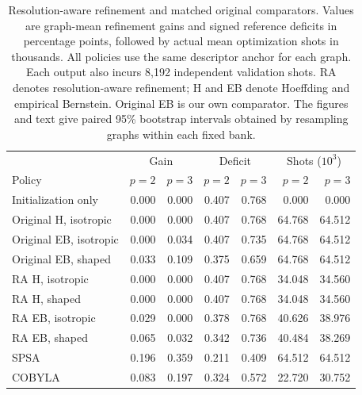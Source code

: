 \begin{table}[t]
\caption{Resolution-aware refinement and matched original comparators. Values are graph-mean refinement gains and signed reference deficits in percentage points, followed by actual mean optimization shots in thousands. All policies use the same descriptor anchor for each graph. Each output also incurs 8,192 independent validation shots. RA denotes resolution-aware refinement; H and EB denote Hoeffding and empirical Bernstein. Original EB is our own comparator. The figures and text give paired 95\% bootstrap intervals obtained by resampling graphs within each fixed bank.}\label{tab:refinement}
\centering\small\setlength{\tabcolsep}{4pt}
\begin{tabular}{lrrrrrr}\toprule
 & \multicolumn{2}{c}{Gain} & \multicolumn{2}{c}{Deficit} & \multicolumn{2}{c}{Shots ($10^3$)} \\
Policy & $p=2$ & $p=3$ & $p=2$ & $p=3$ & $p=2$ & $p=3$ \\ \midrule
Initialization only & 0.000 & 0.000 & 0.407 & 0.768 & 0.000 & 0.000 \\
Original H, isotropic & 0.000 & 0.000 & 0.407 & 0.768 & 64.768 & 64.512 \\
Original EB, isotropic & 0.000 & 0.034 & 0.407 & 0.735 & 64.768 & 64.512 \\
Original EB, shaped & 0.033 & 0.109 & 0.375 & 0.659 & 64.768 & 64.512 \\
RA H, isotropic & 0.000 & 0.000 & 0.407 & 0.768 & 34.048 & 34.560 \\
RA H, shaped & 0.000 & 0.000 & 0.407 & 0.768 & 34.048 & 34.560 \\
RA EB, isotropic & 0.029 & 0.000 & 0.378 & 0.768 & 40.626 & 38.976 \\
RA EB, shaped & 0.065 & 0.032 & 0.342 & 0.736 & 40.484 & 38.269 \\
SPSA & 0.196 & 0.359 & 0.211 & 0.409 & 64.512 & 64.512 \\
COBYLA & 0.083 & 0.197 & 0.324 & 0.572 & 22.720 & 30.752 \\
\bottomrule\end{tabular}\end{table}
\newcommand{\ResolutionResults}{%
\paragraph{Stopping status distinguishes limited resolution from adverse evidence.}
The factorial records the following terminal statuses: \texttt{resolution\_limited}: 256. An unresolved comparison provides insufficient evidence to classify the direction. A resolution-limited stop records the end of the prescribed model or decision schedule without a resolved update. It does not establish stationarity, optimality, or the impossibility of a useful update under another allocation.
The stopping reasons are \texttt{acceptance\_look\_cap}: 230, \texttt{next\_acceptance\_look\_unaffordable}: 26.
}
